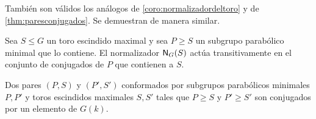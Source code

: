 Tambi\'{e}n son v\'{a}lidos los an\'{a}logos de \ref{coro:normalizadordeltoro}
y de \ref{thm:paresconjugados}. Se demuestran de manera similar.

\begin{coroNormalizadorDelEscindido}\label{coro:normalizadordelescindido}
	Sea $S\leq G$ un toro escindido maximal y sea $P\geq S$ un subgrupo
	parab\'{o}lico minimal que lo contiene. El normalizador
	$\normaliza[G](S)$ act\'{u}a transitivamente en el conjunto de
	conjugados de $P$ que contienen a $S$.
\end{coroNormalizadorDelEscindido}

\begin{teoParesParabolicoEscindidoConjugados}%
	\label{thm:paresparabolicoescindidoconjugados}
	Dos pares $(P,S)$ y $(P',S')$ conformados por subgrupos parab\'{o}licos
	minimales $P,P'$ y toros escindidos maximales $S,S'$ tales que
	$P\geq S$ y $P'\geq S'$ son conjugados por un elemento de $G(k)$.
\end{teoParesParabolicoEscindidoConjugados}

